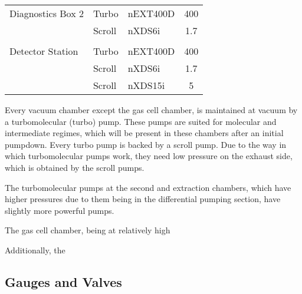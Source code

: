 \begin{table}[h!]
\begin{tabular}{@{}lllc@{}}
                                                            \\
    Diagnostics Box 2   & Turbo     & nEXT400D      & 400   \\
                        & Scroll    & nXDS6i        & 1.7   \\
                                                            \\
    Detector Station    & Turbo     & nEXT400D      & 400   \\
                        & Scroll    & nXDS6i        & 1.7   \\
                        & Scroll    & nXDS15i       & 5     \\
    \hline
    \end{tabular}
 \end{table}

Every vacuum chamber except the gas cell chamber, is maintained at vacuum by a turbomolecular (turbo) pump. These pumps are suited for molecular and intermediate regimes, which will be present in these chambers after an initial pumpdown. Every turbo pump is backed by a scroll pump. Due to the way in which turbomolecular pumps work, they need low pressure on the exhaust side, which is obtained by the scroll pumps.

The turbomolecular pumps at the second and extraction chambers, which have higher pressures due to them being in the differential pumping section, have slightly more powerful pumps.

The gas cell chamber, being at relatively  high

Additionally, the


\subsection{Gauges and Valves}
\label{subsec:gaugesandvalves}




